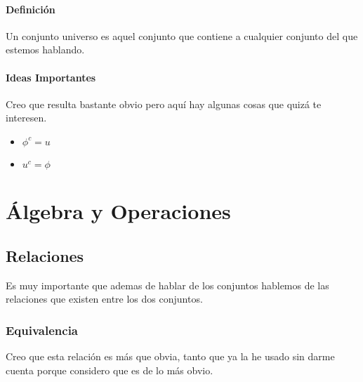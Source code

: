 \documentclass[12pt]{report}                                    %
\begin{document}
        \subsubsection*{Definición}
        Un conjunto universo es aquel conjunto que contiene a cualquier conjunto del que estemos hablando.


        \subsubsection*{Ideas Importantes}
        Creo que resulta bastante obvio pero aquí hay algunas cosas que quizá te interesen.
        \begin{itemize}
            \item $\phi^c = u$
            \item $u^c = \phi$
        \end{itemize}





\chapter{Álgebra y Operaciones}
    \clearpage


    \clearpage
    \section{Relaciones}

        Es muy importante que ademas de hablar de los conjuntos hablemos de las relaciones
        que existen entre los dos conjuntos.


        \subsection{Equivalencia}

            Creo que esta relación es más que obvia, tanto que ya la he usado sin darme cuenta
            porque considero que es de lo más obvio.
\end{document}
